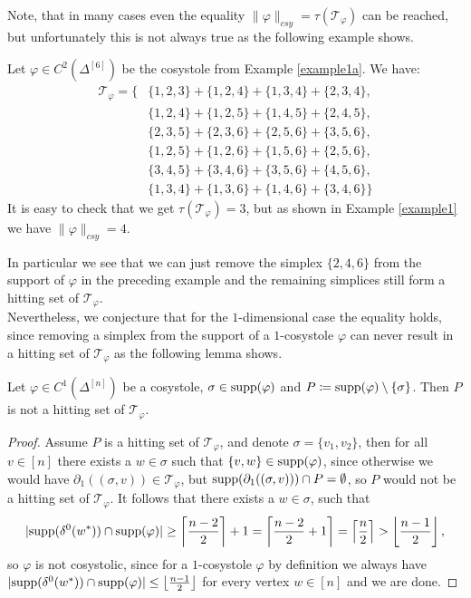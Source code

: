 Note, that in many cases even the equality \(\|\varphi\|_{csy}=\tau(\mathcal{T}_{\varphi})\) can be reached, but unfortunately this is not always true as the following example shows.

\begin{expl}\label{example1b}
Let \(\varphi\in C^2(\Delta^{[6]})\) be the cosystole from Example \ref{example1a}. We have:
\begin{align*}
\mathcal{T}_{\varphi}=\{&\{1,2,3\}+\{1,2,4\}+\{1,3,4\}+\{2,3,4\},\\
&\{1,2,4\}+\{1,2,5\}+\{1,4,5\}+\{2,4,5\},\\
&\{2,3,5\}+\{2,3,6\}+\{2,5,6\}+\{3,5,6\},\\
&\{1,2,5\}+\{1,2,6\}+\{1,5,6\}+\{2,5,6\},\\
&\{3,4,5\}+\{3,4,6\}+\{3,5,6\}+\{4,5,6\},\\
&\{1,3,4\}+\{1,3,6\}+\{1,4,6\}+\{3,4,6\}\}
\end{align*}
It is easy to check that we get \(\tau(\mathcal{T}_{\varphi})=3\), but as shown in Example \ref{example1} we have \(\|\varphi\|_{csy}=4\).
\end{expl}
In particular we see that we can just remove the simplex \(\{2,4,6\}\) from the support of \(\varphi\) in the preceding example and the remaining simplices still form a hitting set of \(\mathcal{T}_{\varphi}\).\\
Nevertheless, we conjecture that for the \(1\)-dimensional case the equality holds, since removing a simplex from the support of a \(1\)-cosystole \(\varphi\) can never result in a hitting set of \(\mathcal{T}_{\varphi}\) as the following lemma shows.

\begin{lem}\label{lemma211}
Let \(\varphi\in C^1(\Delta^{[n]})\) be a cosystole, \(\sigma\in\mathrm{supp}(\varphi)\) and \(P\coloneqq \mathrm{supp}(\varphi)\setminus\{\sigma\}\). Then \(P\) is not a hitting set of \(\mathcal{T}_{\varphi}\).
\begin{proof}
Assume \(P\) is a hitting set of \(\mathcal{T}_{\varphi}\), and denote \(\sigma=\{v_1,v_2\}\), then for all \(v\in[n]\) there exists a \(w\in\sigma\) such that \(\{v,w\}\in\mathrm{supp}(\varphi)\), since otherwise we would have \(\partial_1((\sigma,v))\in\mathcal{T}_{\varphi}\), but \(\mathrm{supp}(\partial_1((\sigma,v)))\cap P=\emptyset\), so \(P\) would not be a hitting set of \(\mathcal{T}_{\varphi}\). It follows that there exists a \(w\in\sigma\), such that
\[
|\mathrm{supp}(\delta^0(w^*))\cap\mathrm{supp}(\varphi)|\geq\left\lceil\frac{n-2}{2}\right\rceil+1=\left\lceil\frac{n-2}{2}+1\right\rceil=\left\lceil\frac{n}{2}\right\rceil>\left\lfloor\frac{n-1}{2}\right\rfloor,
\]
so \(\varphi\) is not cosystolic, since for a \(1\)-cosystole \(\varphi\) by definition we always have\\
\(|\mathrm{supp}(\delta^0(w^*))\cap\mathrm{supp}(\varphi)|\leq\left\lfloor\frac{n-1}{2}\right\rfloor\) for every vertex \(w\in [n]\) and we are done.
\end{proof}
\end{lem}


